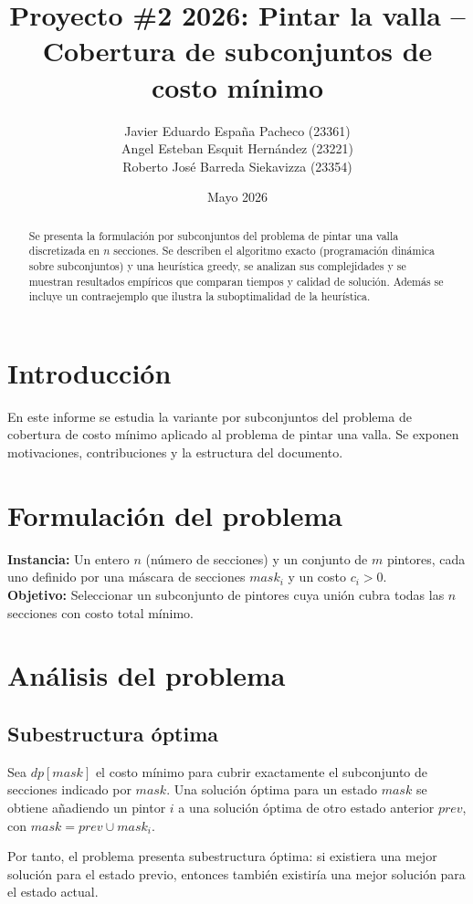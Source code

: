 \documentclass[11pt]{article}
\title{Proyecto \#2 2026: Pintar la valla -- Cobertura de subconjuntos de costo mínimo}
\author{Javier Eduardo Espa\~na Pacheco (23361) \\
Angel Esteban Esquit Hern\'andez (23221) \\
Roberto Jos\'e Barreda Siekavizza (23354)}
\date{Mayo 2026}
\begin{document}
\maketitle

\begin{abstract}
Se presenta la formulación por subconjuntos del problema de pintar una valla discretizada en $n$ secciones. Se describen el algoritmo exacto (programación dinámica sobre subconjuntos) y una heurística greedy, se analizan sus complejidades y se muestran resultados empíricos que comparan tiempos y calidad de solución. Además se incluye un contraejemplo que ilustra la suboptimalidad de la heurística.
\end{abstract}

\section{Introducción}
En este informe se estudia la variante por subconjuntos del problema de cobertura de costo mínimo aplicado al problema de pintar una valla. Se exponen motivaciones, contribuciones y la estructura del documento.

\section{Formulación del problema}
\label{sec:problem}
\noindent
\textbf{Instancia:} Un entero $n$ (número de secciones) y un conjunto de $m$ pintores, cada uno definido por una máscara de secciones $mask_i$ y un costo $c_i>0$. \\
\textbf{Objetivo:} Seleccionar un subconjunto de pintores cuya unión cubra todas las $n$ secciones con costo total mínimo.

\section{Análisis del problema}
\label{sec:analysis}
\subsection{Subestructura óptima}
\noindent
Sea $dp[mask]$ el costo mínimo para cubrir exactamente el subconjunto de secciones indicado por $mask$. Una solución óptima para un estado $mask$ se obtiene añadiendo un pintor $i$ a una solución óptima de otro estado anterior $prev$, con $mask = prev \cup mask_i$.

Por tanto, el problema presenta subestructura óptima: si existiera una mejor solución para el estado previo, entonces también existiría una mejor solución para el estado actual.
\end{document}
